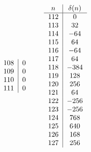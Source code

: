 \documentclass[12pt]{amsart}
\theoremstyle{definition}
\numberwithin{equation}{section}
\begin{document}
\[\begin{tabular}{c|c}
108  &  0\\
109  &  0\\110  &  0\\ 111  &  0
\end{tabular}\qquad
\begin{tabular}{c|c}
    $n$ & $\delta(n)$\\
     \hline
     112  &  0\\ 113  &  32\\114  &  $-64$\\115  &  64\\116  &  $-64$\\117  &  64\\118  &  $-384$\\119  &  128\\120  &  256\\121  &  64\\122  &  $-256$\\123  &  $-256$\\124  &  768\\125  &  640\\126  &  168\\127  &  256 
\end{tabular}
\]
\end{document}

